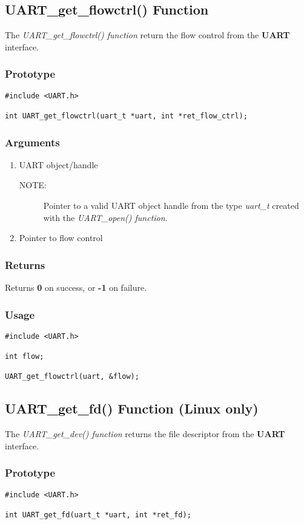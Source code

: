 \documentclass{report}
\begin{document}
\subsection{UART\_get\_flowctrl() Function}
The \textit{UART\_get\_flowctrl() function} return the flow
control from the \textbf{UART} interface.
\subsubsection*{Prototype}
\begin{lstlisting}
#include <UART.h>

int UART_get_flowctrl(uart_t *uart, int *ret_flow_ctrl);
\end{lstlisting}
\subsubsection*{Arguments}
\begin{enumerate}
\item UART object/handle
\begin{description}
\item[NOTE:] Pointer to a valid UART object handle from the type \textit{uart\_t}
created with the \textit{UART\_open() function}.
\end{description}
\item Pointer to flow control
\end{enumerate}
\subsubsection*{Returns}
Returns \textbf{0} on success, or \textbf{-1} on failure.
\subsubsection*{Usage}
\begin{lstlisting}
#include <UART.h>

int flow;

UART_get_flowctrl(uart, &flow);
\end{lstlisting}
\subsection{UART\_get\_fd() Function (Linux only)}
The \textit{UART\_get\_dev() function} returns the file
descriptor from the \textbf{UART} interface.
\subsubsection*{Prototype}
\begin{lstlisting}
#include <UART.h>

int UART_get_fd(uart_t *uart, int *ret_fd);
\end{lstlisting}
\end{document}
